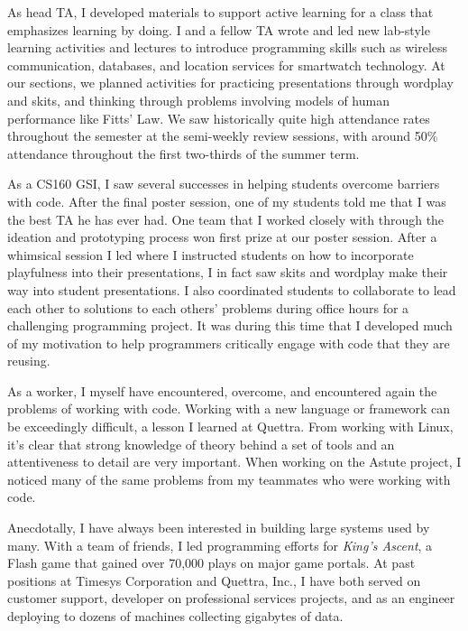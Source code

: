 \documentclass[12pt]{memoir}
\begin{document}
As head TA, I developed materials to support active learning for a class that emphasizes learning by doing.
I and a fellow TA wrote and led new lab-style learning activities and lectures to introduce programming skills such as wireless communication, databases, and location services for smartwatch technology.
At our sections, we planned activities for practicing presentations through wordplay and skits, and thinking through problems involving models of human performance like Fitts' Law.
We saw historically quite high attendance rates throughout the semester at the semi-weekly review sessions, with around 50\% attendance throughout the first two-thirds of the summer term.

As a CS160 GSI, I saw several successes in helping students overcome barriers with code.
After the final poster session, one of my students told me that I was the best TA he has ever had.
One team that I worked closely with through the ideation and prototyping process won first prize at our poster session.
After a whimsical session I led where I instructed students on how to incorporate playfulness into their presentations, I in fact saw skits and wordplay make their way into student presentations.
I also coordinated students to collaborate to lead each other to solutions to each others' problems during office hours for a challenging programming project.
It was during this time that I developed much of my motivation to help programmers critically engage with code that they are reusing.


As a worker, I myself have encountered, overcome, and encountered again the problems of working with code.
Working with a new language or framework can be exceedingly difficult, a lesson I learned at Quettra.
From working with Linux, it's clear that strong knowledge of theory behind a set of tools and an attentiveness to detail are very important.
When working on the Astute project, I noticed many of the same problems from my teammates who were working with code.

Anecdotally, I have always been interested in building large systems used by many.
With a team of friends, I led programming efforts for \emph{King's Ascent}, a Flash game that gained over 70,000 plays on major game portals.
At past positions at Timesys Corporation and Quettra, Inc., I have both served on customer support, developer on professional services projects, and as an engineer deploying to dozens of machines collecting gigabytes of data.
\end{document}
